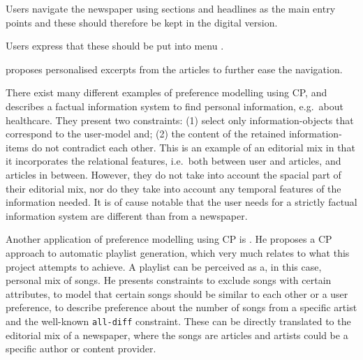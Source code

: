 Users navigate the newspaper using sections and headlines as the main entry points \cite{FULLTEXT01.pdf} and these should therefore be kept in the digital version.

Users express that these should be put into menu \cite{kristin_fredrik.pdf}.

\cite{fulltext.pdf} proposes personalised excerpts from the articles to further ease the navigation.

There exist many different examples of preference modelling using CP, and \cite{Constraint-Satisfaction-Methods-for-Information-Personalization.pdf} describes a factual information system to find personal information, e.g.\ about healthcare. They present two constraints: (1) select only information-objects that correspond to the user-model and; (2) the content of the retained information-items do not contradict each other. This is an example of an editorial mix in that it incorporates the relational features, i.e.\ both between user and articles, and articles in between. However, they do not take into account the spacial part of their editorial mix, nor do they take into account any temporal features of the information needed. It is of cause notable that the user needs for a strictly factual information system are different than from a newspaper.

Another application of preference modelling using CP is \cite{LSVossen}. He proposes a CP approach to automatic playlist generation, which very much relates to what this project attempts to achieve. A playlist can be perceived as a, in this case, personal mix of songs. He presents constraints to exclude songs with certain attributes, to model that certain songs should be similar to each other or a user preference, to describe preference about the number of songs from a specific artist and the well-known \texttt{all-diff} constraint. These can be directly translated to the editorial mix of a newspaper, where the songs are articles and artists could be a specific author or content provider.

